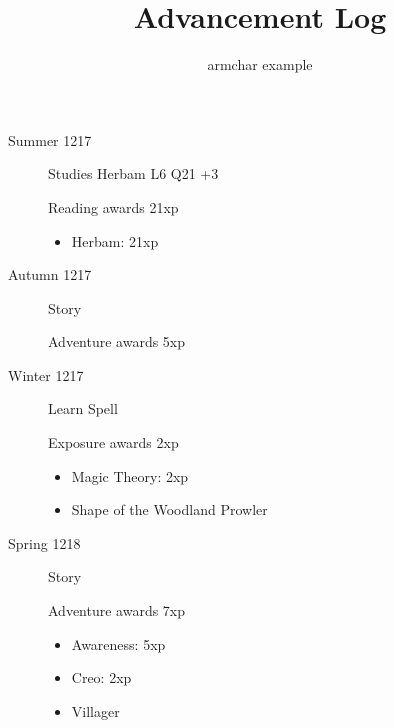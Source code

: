 \documentclass{scrartcl}
\title{Advancement Log}
\author{armchar example}
\begin{document}
\maketitle
\begin{description}
  \item[Summer 1217]
    Studies Herbam L6 Q21 +3

    Reading awards 21xp
    \begin{itemize}
      \item Herbam: 21xp
    \end{itemize}
  \item[Autumn 1217]
    Story

    Adventure awards 5xp
    \begin{itemize}
    \end{itemize}
  \item[Winter 1217]
    Learn Spell

    Exposure awards 2xp
    \begin{itemize}
      \item Magic Theory: 2xp
      \item Shape of the Woodland Prowler
    \end{itemize}
  \item[Spring 1218]
    Story

    Adventure awards 7xp
    \begin{itemize}
      \item Awareness: 5xp
      \item Creo: 2xp
      \item Villager
    \end{itemize}
\end{description}
\end{document}
